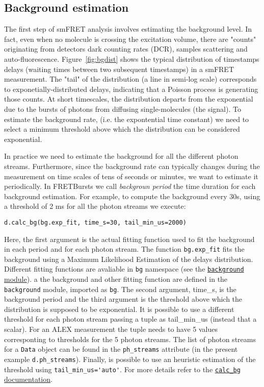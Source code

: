 \subsection{Background estimation}

The first step of smFRET analysis involves estimating the background level. In fact,  even when no molecule is crossing the excitation volume, there are "counts" originating from detectors dark counting rates (DCR), samples scattering and auto-fluorescence. Figure~\ref{fig:bgdist} shows the typical distribution of timestamps delays (waiting times between two subsequent timestamps) in a smFRET measurement. The "tail" of the distribution (a line in semi-log scale) corresponds to exponetially-distributed delays, indicating that a Poisson process is generating those counts. At short timescales, the distribution departs from the exponential due to the bursts of photons from diffusing single-molecules (the signal).
To estimate the background rate, (i.e. the expontential time constant) we need to select a minimum threshold above which the distribution can be considered exponential. 

In practice we need to estimate the background for all the different photon streams. Furthermore, since the background rate can typically changes during the measurement on time scales of tens of seconds or minutes, we want to estimate it periodically. 
In FRETBursts we call \textit{backgroun period} the time duration for each background estimation. For example, to compute the background every 30s, using a threshold of 2 ms for all the photon streams we execute:

\verb|d.calc_bg(bg.exp_fit, time_s=30, tail_min_us=2000)|

Here, the first argument is the actual fitting function used to fit the background in each period and for each photon stream. The function \verb|bg.exp_fit| fits the background using a Maximum Likelihood Estimation of the delays distribution. Different fitting functions are avaliable in \verb|bg| namespace (see the \href{http://fretbursts.readthedocs.org/en/latest/background.html}{\verb|background| module}). a the background and other fitting function are defined in the \verb|background| module, imported as \verb|bg|. The second argument, time_s, is the background period and the third argument is the threshold above which the distribution is supposed to be exponential. It is possible to use a different threshold for each photon stream passing a tuple as tail_min_us (instead that a scalar). For an ALEX measurement the tuple needs to have 5 values corresponting to thresholds for the 5 photon streams. The list of photon streams for a \verb|Data| object can be found in the \verb|ph_streams| attribute (in the present example \verb|d.ph_streams|). Finally, is possible to use an heuristic estimation of the threshold using \verb|tail_min_us='auto'|. For more details refer to the \href{http://fretbursts.readthedocs.org/en/latest/data_class.html#fretbursts.burstlib.Data.calc_bg}{\verb|calc_bg| documentation}.

